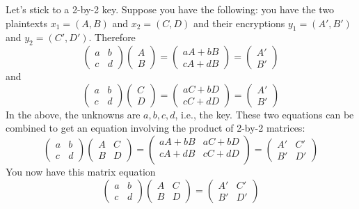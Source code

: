 Let's stick to a 2-by-2 key.
Suppose you have the following:
you have the two plaintexts
$x_1 = (A, B)$ and $x_2 = (C, D)$
and their encryptions
$y_1 = (A', B')$ and $y_2 = (C', D')$.
Therefore
\[
\begin{pmatrix}
  a & b \\
  c & d 
\end{pmatrix}
\begin{pmatrix}
  A \\
  B 
\end{pmatrix}
=
\begin{pmatrix}
  aA + bB \\
  cA + dB 
\end{pmatrix}
=
\begin{pmatrix}
  A' \\
  B' 
\end{pmatrix}
\]
and
\[
\begin{pmatrix}
  a & b \\
  c & d 
\end{pmatrix}
\begin{pmatrix}
  C \\
  D 
\end{pmatrix}
=
\begin{pmatrix}
  aC + bD \\
  cC + dD 
\end{pmatrix}
=
\begin{pmatrix}
  A' \\
  B' 
\end{pmatrix}
\]
In the above, the unknowns are $a,b,c,d$, i.e., the key.
These two equations can be combined to get an equation involving
the product of 2-by-2 matrices:
\[
\begin{pmatrix}
  a & b \\
  c & d 
\end{pmatrix}
\begin{pmatrix}
  A & C \\
  B & D 
\end{pmatrix}
=
\begin{pmatrix}
  aA + bB & aC + bD \\
  cA + dB & cC + dD \\
\end{pmatrix}
=
\begin{pmatrix}
  A' & C' \\
  B' & D'
\end{pmatrix}
\]
You now have this matrix equation
\[
\begin{pmatrix}
  a & b \\
  c & d 
\end{pmatrix}
\begin{pmatrix}
  A & C \\
  B & D 
\end{pmatrix}
=
\begin{pmatrix}
  A' & C' \\
  B' & D'
\end{pmatrix}
\]
